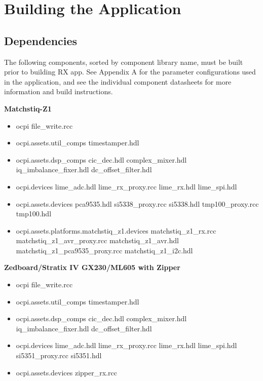 \documentclass{article}
\begin{document}
\section{Building the Application}
\subsection{Dependencies}
\noindent The following components, sorted by component library name, must be built prior to building RX app. See Appendix A for the parameter configurations used in the application, and see the individual component datasheets for more information and build instructions.\par\bigskip
	\begin{minipage}[t]{.5\textwidth}
	\textbf{Matchstiq-Z1}
	\begin{itemize}
		\item ocpi
			\subitem file\_write.rcc
		\item ocpi.assets.util\_comps
			\subitem timestamper.hdl
		\item ocpi.assets.dsp\_comps
			\subitem cic\_dec.hdl
			\subitem complex\_mixer.hdl
			\subitem iq\_imbalance\_fixer.hdl
			\subitem dc\_offset\_filter.hdl
		\item ocpi.devices
			\subitem lime\_adc.hdl
			\subitem lime\_rx\_proxy.rcc
			\subitem lime\_rx.hdl
			\subitem lime\_spi.hdl
		\item ocpi.assets.devices
			\subitem pca9535.hdl
			\subitem si5338\_proxy.rcc
			\subitem si5338.hdl
			\subitem tmp100\_proxy.rcc
			\subitem tmp100.hdl
		\item ocpi.assets.platforms.matchstiq\_z1.devices
			\subitem matchstiq\_z1\_rx.rcc
			\subitem matchstiq\_z1\_avr\_proxy.rcc
			\subitem matchstiq\_z1\_avr.hdl
			\subitem matchstiq\_z1\_pca9535\_proxy.rcc
			\subitem matchstiq\_z1\_i2c.hdl
	\end{itemize}
	\end{minipage}
	\begin{minipage}[t]{.5\textwidth}
	\textbf{Zedboard/Stratix IV GX230/ML605 with Zipper}
	\begin{itemize}
		\item ocpi
			\subitem file\_write.rcc
		\item ocpi.assets.util\_comps
			\subitem timestamper.hdl
		\item ocpi.assets.dsp\_comps
			\subitem cic\_dec.hdl
			\subitem complex\_mixer.hdl
			\subitem iq\_imbalance\_fixer.hdl
			\subitem dc\_offset\_filter.hdl
		\item ocpi.devices
			\subitem lime\_adc.hdl
			\subitem lime\_rx\_proxy.rcc
			\subitem lime\_rx.hdl
			\subitem lime\_spi.hdl
			\subitem si5351\_proxy.rcc
			\subitem si5351.hdl
		\item ocpi.assets.devices
			\subitem zipper\_rx.rcc
	\end{itemize}
	\end{minipage}
\newpage
\end{document}
